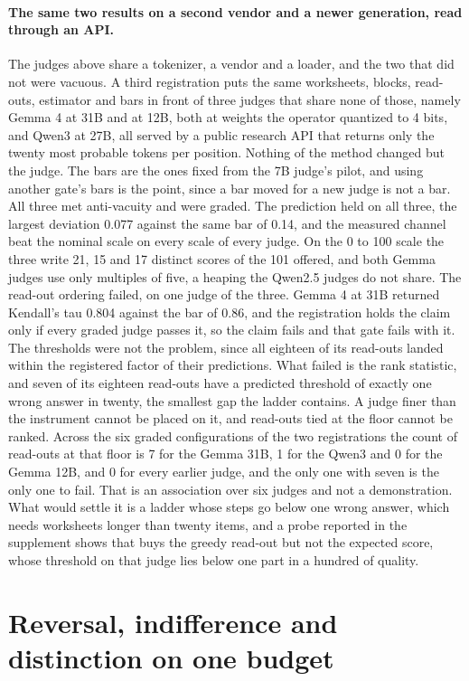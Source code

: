 \documentclass{article}
\theoremstyle{definition}
\theoremstyle{remark}
\begin{document}
\paragraph{The same two results on a second vendor and a newer generation, read through an API.}
The judges above share a tokenizer, a vendor and a loader, and the two that did not were vacuous.
A third registration puts the same worksheets, blocks, read-outs, estimator and bars in front of three judges that share none of those, namely Gemma 4 at 31B and at 12B, both at weights the operator quantized to 4 bits, and Qwen3 at 27B, all served by a public research API that returns only the twenty most probable tokens per position.
Nothing of the method changed but the judge. The bars are the ones fixed from the 7B judge's pilot, and using another gate's bars is the point, since a bar moved for a new judge is not a bar.
All three met anti-vacuity and were graded.
The prediction held on all three, the largest deviation 0.077 against the same bar of 0.14, and the measured channel beat the nominal scale on every scale of every judge.
On the 0 to 100 scale the three write 21, 15 and 17 distinct scores of the 101 offered, and both Gemma judges use only multiples of five, a heaping the Qwen2.5 judges do not share.
The read-out ordering failed, on one judge of the three.
Gemma 4 at 31B returned Kendall's tau 0.804 against the bar of 0.86, and the registration holds the claim only if every graded judge passes it, so the claim fails and that gate fails with it.
The thresholds were not the problem, since all eighteen of its read-outs landed within the registered factor of their predictions.
What failed is the rank statistic, and seven of its eighteen read-outs have a predicted threshold of exactly one wrong answer in twenty, the smallest gap the ladder contains.
A judge finer than the instrument cannot be placed on it, and read-outs tied at the floor cannot be ranked.
Across the six graded configurations of the two registrations the count of read-outs at that floor is 7 for the Gemma 31B, 1 for the Qwen3 and 0 for the Gemma 12B, and 0 for every earlier judge, and the only one with seven is the only one to fail.
That is an association over six judges and not a demonstration. What would settle it is a ladder whose steps go below one wrong answer, which needs worksheets longer than twenty items, and a probe reported in the supplement shows that buys the greedy read-out but not the expected score, whose threshold on that judge lies below one part in a hundred of quality.

\section{Reversal, indifference and distinction on one budget}
\label{sec:flip}
\end{document}
